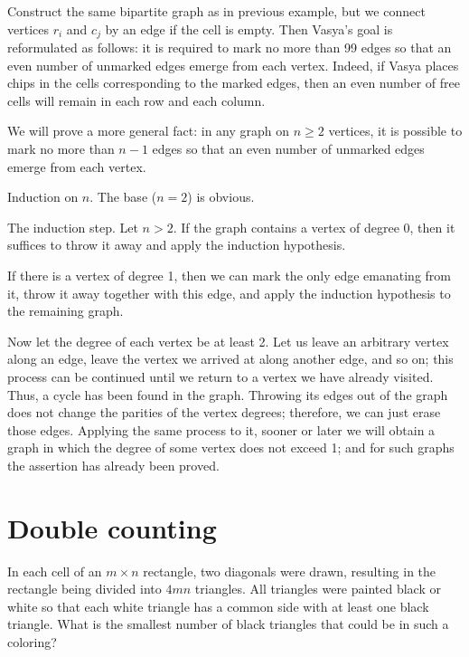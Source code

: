 Construct the same bipartite graph as in previous example, but we connect vertices $r_i$ and $c_j$ by an edge if the cell is empty. Then Vasya's goal is reformulated as follows: it is required to mark no more than 99 edges so that an even number of unmarked edges emerge from each vertex. Indeed, if Vasya places chips in the cells corresponding to the marked edges, then an even number of free cells will remain in each row and each column.

We will prove a more general fact: in any graph on $n\geq2$ vertices, it is possible to mark no more than $n-1$ edges so that an even number of unmarked edges emerge from each vertex.

Induction on $n$. The base ($n = 2$) is obvious.

The induction step. Let $n>2$. If the graph contains a vertex of degree 0, then it suffices to throw it away and apply the induction hypothesis.

If there is a vertex of degree 1, then we can mark the only edge emanating from it, throw it away together with this edge, and apply the induction hypothesis to the remaining graph.

Now let the degree of each vertex be at least 2. Let us leave an arbitrary vertex along an edge, leave the vertex we arrived at along another edge, and so on; this process can be continued until we return to a vertex we have already visited. Thus, a cycle has been found in the graph. Throwing its edges out of the graph does not change the parities of the vertex degrees; therefore, we can just erase those edges. Applying the same process to it, sooner or later we will obtain a graph in which the degree of some vertex does not exceed 1; and for such graphs the assertion has already been proved.

\newpage

\section{Double counting}

\begin{example}
    In each cell of an $m\times n$ rectangle, two diagonals were drawn, resulting in the rectangle being divided into $4mn$ triangles. All triangles were painted black or white so that each white triangle has a common side with at least one black triangle. What is the smallest number of black triangles that could be in such a coloring?
\end{example}

